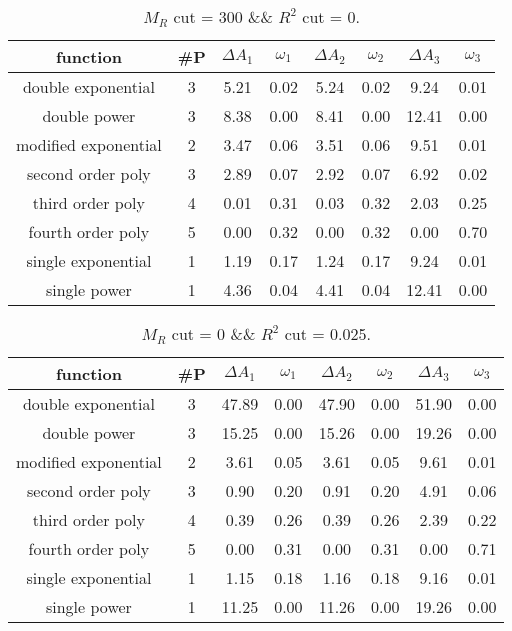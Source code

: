  
\begin{table}[H] 
\begin{center} 
\begin{tabular}{|c|c|cc|cc|cc|} 
\hline function & \#P & $\Delta A_1$ & $\omega_1$ & $\Delta A_2$ & $\omega_2$ & $\Delta A_3$ & $\omega_3$ \\ \hline 
double exponential &  3 &   5.21 &   0.02 &   5.24 &   0.02 &   9.24 &   0.01 \\ 
double power &  3 &   8.38 &   0.00 &   8.41 &   0.00 &  12.41 &   0.00 \\ 
modified exponential &  2 &   3.47 &   0.06 &   3.51 &   0.06 &   9.51 &   0.01 \\ 
second order poly &  3 &   2.89 &   0.07 &   2.92 &   0.07 &   6.92 &   0.02 \\ 
third order poly &  4 &   0.01 &   0.31 &   0.03 &   0.32 &   2.03 &   0.25 \\ 
fourth order poly &  5 &   0.00 &   0.32 &   0.00 &   0.32 &   0.00 &   0.70 \\ 
single exponential &  1 &   1.19 &   0.17 &   1.24 &   0.17 &   9.24 &   0.01 \\ 
single power &  1 &   4.36 &   0.04 &   4.41 &   0.04 &  12.41 &   0.00 \\ 
\hline 
\end{tabular} 
\caption{$M_R$ cut = 300 \&\& $R^2$ cut = 0.} 
\label{tab:FitChoices_300_0} 
\end{center} 
\end{table} 
 
 
\begin{table}[H] 
\begin{center} 
\begin{tabular}{|c|c|cc|cc|cc|} 
\hline function & \#P & $\Delta A_1$ & $\omega_1$ & $\Delta A_2$ & $\omega_2$ & $\Delta A_3$ & $\omega_3$ \\ \hline 
double exponential &  3 &  47.89 &   0.00 &  47.90 &   0.00 &  51.90 &   0.00 \\ 
double power &  3 &  15.25 &   0.00 &  15.26 &   0.00 &  19.26 &   0.00 \\ 
modified exponential &  2 &   3.61 &   0.05 &   3.61 &   0.05 &   9.61 &   0.01 \\ 
second order poly &  3 &   0.90 &   0.20 &   0.91 &   0.20 &   4.91 &   0.06 \\ 
third order poly &  4 &   0.39 &   0.26 &   0.39 &   0.26 &   2.39 &   0.22 \\ 
fourth order poly &  5 &   0.00 &   0.31 &   0.00 &   0.31 &   0.00 &   0.71 \\ 
single exponential &  1 &   1.15 &   0.18 &   1.16 &   0.18 &   9.16 &   0.01 \\ 
single power &  1 &  11.25 &   0.00 &  11.26 &   0.00 &  19.26 &   0.00 \\ 
\hline 
\end{tabular} 
\caption{$M_R$ cut = 0 \&\& $R^2$ cut = 0.025.} 
\label{tab:FitChoices_0_0.025} 
\end{center} 
\end{table} 
 
